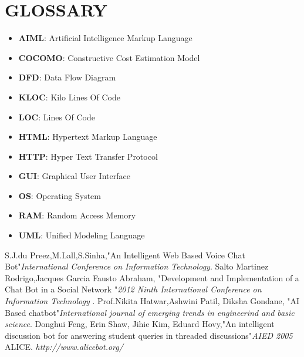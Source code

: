 \documentclass[12pt,a4paper,oneside]{report}
\begin{document}
\chapter{GLOSSARY}
\begin{itemize}
\item\textbf{ AIML}: Artificial Intelligence Markup Language
\item\textbf{ COCOMO}: Constructive Cost Estimation Model
\item\textbf{ DFD}: Data Flow Diagram
\item\textbf{ KLOC}: Kilo Lines Of Code
\item\textbf{ LOC}: Lines Of Code
\item\textbf{ HTML}: Hypertext Markup Language
\item\textbf{ HTTP}: Hyper Text Transfer Protocol
\item\textbf{ GUI}: Graphical User Interface
\item\textbf{ OS}: Operating System
\item\textbf{ RAM}: Random Access Memory
\item\textbf{ UML}: Unified Modeling Language
\end{itemize}
\renewcommand{\bibname}{REFERENCES}
\begin{thebibliography}{999}
  S.J.du Preez,M.Lall,S.Sinha,"An Intelligent Web Based Voice Chat Bot"\textit{International Conference on Information Technology}.
  Salto Martinez Rodrigo,Jacques Garcia Fausto Abraham, "Development and Implementation of a Chat Bot in a Social Network "\textit{2012 Ninth International Conference on Information Technology }.
  Prof.Nikita Hatwar,Ashwini Patil, Diksha Gondane, "AI Based chatbot"\textit{International journal of emerging trends in engineerind and basic science}.
  Donghui Feng, Erin Shaw, Jihie Kim, Eduard Hovy,"An intelligent discussion bot for answering student queries in threaded discussions"\textit{AIED 2005}
 ALICE. \textit{http://www.alicebot.org/}
\end{thebibliography}

	
\end{document}
